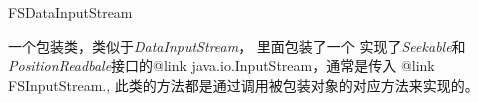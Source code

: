 \begin{XeClass}{FSDataInputStream}
   
 一个包装类，类似于\emph{DataInputStream}， 里面包装了一个
 实现了\emph{Seekable}和\emph{PositionReadbale}接口的{@link java.io.InputStream}，通常是传入 {@link FSInputStream.},
 此类的方法都是通过调用被包装对象的对应方法来实现的。

\end{XeClass}
